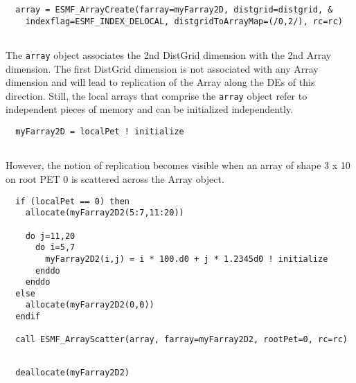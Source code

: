 
 \begin{verbatim}
  array = ESMF_ArrayCreate(farray=myFarray2D, distgrid=distgrid, &
    indexflag=ESMF_INDEX_DELOCAL, distgridToArrayMap=(/0,2/), rc=rc)
 
\end{verbatim}
 

   The {\tt array} object associates the 2nd DistGrid dimension with the 2nd
   Array dimension. The first DistGrid dimension is not associated with any
   Array dimension and will lead to replication of the Array along the DEs of
   this direction. Still, the local arrays that comprise the {\tt array} 
   object refer to independent pieces of memory and can be initialized 
   independently. 

 \begin{verbatim}
  myFarray2D = localPet ! initialize
 
\end{verbatim}
 

   However, the notion of replication becomes visible when an array of shape
   3 x 10 on root PET 0 is scattered across the Array object. 

 \begin{verbatim}
  if (localPet == 0) then
    allocate(myFarray2D2(5:7,11:20))
  
    do j=11,20
      do i=5,7
        myFarray2D2(i,j) = i * 100.d0 + j * 1.2345d0 ! initialize
      enddo
    enddo
  else
    allocate(myFarray2D2(0,0))
  endif
  
  call ESMF_ArrayScatter(array, farray=myFarray2D2, rootPet=0, rc=rc)
 
\end{verbatim}
 

 \begin{verbatim}
  deallocate(myFarray2D2)
 
\end{verbatim}
 

